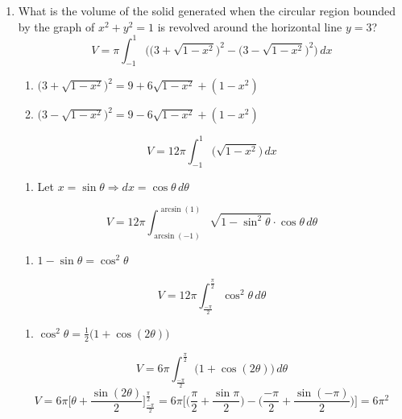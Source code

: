 \documentclass[12pt]{article}
\begin{document}
\begin{enumerate}
    \item What is the volume of the solid generated when the circular region bounded by the graph of $x^2+y^2=1$ is revolved around the horizontal line $y=3$?
    $$V=\pi \int_{-1}^{1} \Biggr(\bigg(3+\sqrt{1-x^2}\bigg)^2-\bigg(3-\sqrt{1-x^2}\bigg)^2\Biggr) \, dx$$
    \begin{enumerate}
        \item $\bigg(3+\sqrt{1-x^2}\bigg)^2 = 9+6\sqrt{1-x^2}+(1-x^2)$ 
        \item $\bigg(3-\sqrt{1-x^2}\bigg)^2 = 9-6\sqrt{1-x^2}+(1-x^2)$ 
    \end{enumerate}
    $$V=12\pi\int_{-1}^{1} \biggr(\sqrt{1-x^2}\biggr) \, dx$$
    \begin{enumerate}[resume]
        \item Let $x=\sin \theta \Longrightarrow dx = \cos \theta \, d\theta$
    \end{enumerate}
    $$V=12\pi\int_{\arcsin(-1)}^{\arcsin(1)} \sqrt{1-\sin^2 \theta} \cdot \cos\theta \, d\theta$$
    \begin{enumerate}[resume]
        \item $1-\sin\theta = \cos^2 \theta$
    \end{enumerate}
     $$V=12\pi\int_{\frac{-\pi}{2}}^{\frac{\pi}{2}} \cos^2 \theta \, d\theta$$
\begin{enumerate}[resume]
        \item $\cos^2 \theta = \frac{1}{2}\biggr(1+\cos(2\theta)\biggr)$
    \end{enumerate}
 $$V=6\pi\int_{\frac{-\pi}{2}}^{\frac{\pi}{2}} \biggr(1+\cos(2\theta)\biggr) \, d\theta$$
 $$V=6\pi\biggr[\theta +\frac{\sin (2\theta)}{2}\biggr]_{\frac{-\pi}{2}}^{\frac{\pi}{2}}=6\pi\Biggr[\bigg(\frac{\pi}{2}+\frac{\sin \pi}{2}\bigg)-\bigg(\frac{-\pi}{2}+\frac{\sin (-\pi)}{2}\bigg)\Biggr] =\boxed{ 6\pi^2}$$
    

\end{enumerate}
\end{document}
